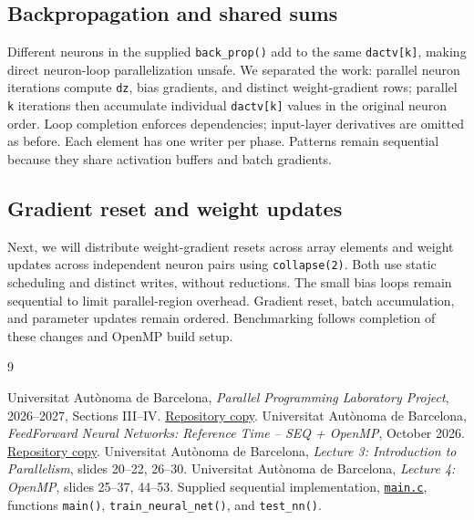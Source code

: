 \documentclass[10pt,a4paper,twocolumn]{article}
\begin{document}
\subsection{Backpropagation and shared sums}

Different neurons in the supplied \texttt{back\_prop()} add to the same
\texttt{dactv[k]}, making direct neuron-loop parallelization unsafe. We
separated the work: parallel neuron iterations compute \texttt{dz}, bias
gradients, and distinct weight-gradient rows; parallel \texttt{k} iterations
then accumulate individual \texttt{dactv[k]} values in the original neuron
order. Loop completion enforces dependencies; input-layer derivatives are
omitted as before. Each element has one writer per phase. Patterns remain
sequential because they share activation buffers and batch gradients.

\subsection{Gradient reset and weight updates}

Next, we will distribute weight-gradient resets across array elements and
weight updates across independent neuron pairs using \texttt{collapse(2)}.
Both use static scheduling and distinct writes, without reductions. The
small bias loops remain sequential to limit parallel-region overhead.
Gradient reset, batch accumulation, and parameter updates remain ordered.
Benchmarking follows completion of these changes and OpenMP build setup.

\begin{thebibliography}{9}
  \small
  \raggedright
    Universitat Aut\`onoma de Barcelona,
    \textit{Parallel Programming Laboratory Project},
    2026--2027, Sections III--IV.
    \href{../../resources/CAP_Pra_ctica_NN_26_27.pdf}{Repository copy}.
    Universitat Aut\`onoma de Barcelona,
    \textit{FeedForward Neural Networks: Reference Time -- SEQ + OpenMP},
    October 2026.
    \href{../../resources/ReferenceTimesOpenMP26_27.pdf}{Repository copy}.
    Universitat Aut\`onoma de Barcelona,
    \textit{Lecture 3: Introduction to Parallelism},
    slides 20--22, 26--30.
    Universitat Aut\`onoma de Barcelona,
    \textit{Lecture 4: OpenMP}, slides 25--37, 44--53.
    Supplied sequential implementation,
    \href{../../code/XXNN-Multinivell-main/main.c}{\texttt{main.c}},
    functions \texttt{main()}, \texttt{train\_neural\_net()}, and
    \texttt{test\_nn()}.
\end{thebibliography}
\end{document}
